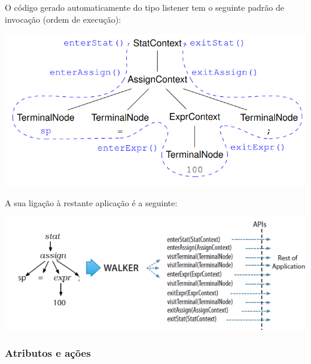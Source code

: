 \documentclass{article}
\begin{document}
\begin{flushleft}
  \item  O código gerado automaticamente do tipo listener tem o
  seguinte padrão de invocação (ordem de execução):

  \begin{center}
    \includegraphics[scale=0.3]{29}
  \end{center}

  \item A sua ligação à restante aplicação é a seguinte:

  \begin{center}
    \includegraphics[scale=0.3]{30}
  \end{center}
\end{flushleft}

\pagebreak
\subsubsection{Atributos e ações}
\end{document}
